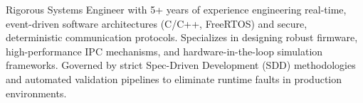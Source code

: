 
\begin{cvparagraph}
  Rigorous Systems Engineer with 5+ years of experience engineering real-time, event-driven software architectures (C/C++, FreeRTOS) and secure, deterministic communication protocols. Specializes in designing robust firmware, high-performance IPC mechanisms, and hardware-in-the-loop simulation frameworks. Governed by strict Spec-Driven Development (SDD) methodologies and automated validation pipelines to eliminate runtime faults in production environments.
\end{cvparagraph}
